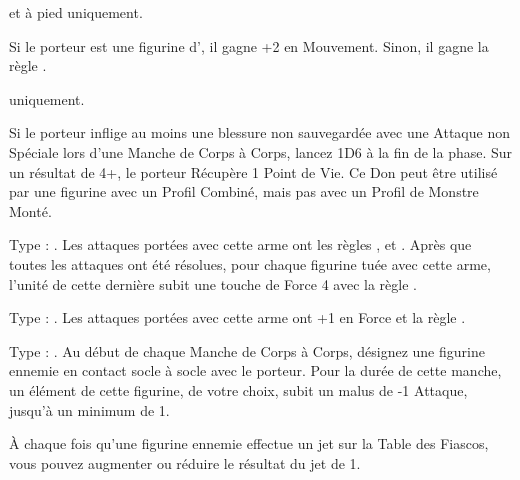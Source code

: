 \begin{multicols}{2}
 \textbf{\dlust} et à pied uniquement.

Si le porteur est une figurine d'\infantry{}, il gagne +2 en Mouvement. Sinon, il gagne la règle \swiftstride{}.

 \textbf{\wrath} uniquement.

Si le porteur inflige au moins une blessure non sauvegardée avec une Attaque non Spéciale lors d'une Manche de Corps à Corps, lancez 1D6 à la fin de la phase. Sur un résultat de 4+, le porteur Récupère 1 Point de Vie. Ce Don peut être utilisé par une figurine avec un Profil Combiné, mais pas avec un Profil de Monstre Monté.

\endpricelistNSP

\end{multicols}

\closearmynewsection









\startarmymagicalitems

\armymagicalweapons

\startpricelist

 Type : \hw{}. Les attaques portées avec cette arme ont les règles \flamingattacks{},  et . Après que toutes les attaques ont été résolues, pour chaque figurine tuée avec cette arme, l'unité de cette dernière subit une touche de Force 4 avec la règle \flamingattacks{}.

 Type : \spear{}. Les attaques portées avec cette arme ont +1 en Force et la règle .

\endpricelist

\armymagicalarmour

\startpricelist

Type : \shield{}. Au début de chaque Manche de Corps à Corps, désignez une figurine ennemie en contact socle à socle avec le porteur. Pour la durée de cette manche, un élément de cette figurine, de votre choix, subit un malus de -1 Attaque, jusqu'à un minimum de 1.

\endpricelist

\armyarcaneitems

\startpricelist

À chaque fois qu'une figurine ennemie effectue un jet sur la Table des Fiascos, vous pouvez augmenter ou réduire le résultat du jet de 1.

